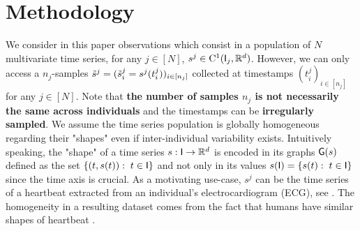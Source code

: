 \section{Methodology}
\label{section:methodology}
\vspace{-1ex}
We consider in this paper observations which consist in a population of $N$ multivariate time series, for any $j\in[N]$, $s^j \in \mathrm{C}^1(\mathsf{I}_j,\mathbb{R}^{d})$. 
However, we can only access a $n_j$-samples $\tilde{s}^j=(\tilde{s}_i^j=s^j(t^j_i))_{i\in[n_j]}$ collected at timestamps $(t^j_i)_{i\in[n_j]}$ for any $j \in [N]$.
 Note that \textbf{the number of samples $n_j$ is not necessarily the same across individuals} and the timestamps can be \textbf{irregularly sampled}.
 We assume the time series population is globally homogeneous regarding their "shapes" even if inter-individual variability exists.
 Intuitively speaking, the "shape" of a time series $s:\mathsf{I}\to \mathbb{R}^d$ is encoded in its graphs $\mathsf{G}(s)$ defined as the set $\{(t,s(t)):\; t\in\mathsf{I} \} $ and not only in its values $s(\mathsf{I})=\{s(t):\; t\in\mathsf{I} \} $ since the time axis is crucial. %
 As a motivating use-case, $s^j$ can be the time series of a heartbeat extracted from an individual's electrocardiogram (ECG), see .
 The homogeneity in a resulting dataset comes from the fact that humans have similar shapes of heartbeat \cite{ye2012heartbeat,madona2021pqrst}.
\vspace{-1ex}
